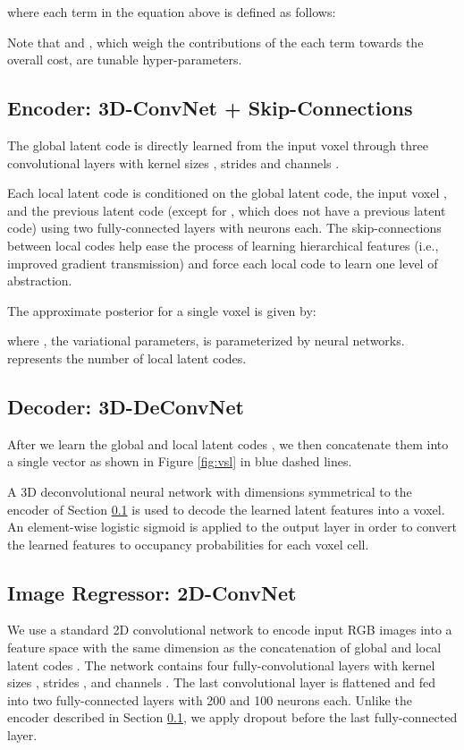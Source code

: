 \documentclass[10pt,twocolumn,letterpaper]{article}
\begin{document}
where each term in the equation above is defined as follows:

Note that  and , which weigh the contributions of the each term towards the overall cost, are tunable hyper-parameters.

\subsection{Encoder: 3D-ConvNet + Skip-Connections}
\label{subsec:encoder}
The global latent code  is directly learned from the input voxel through three convolutional layers with kernel sizes , strides  and channels .

Each local latent code  is conditioned on the global latent code, the input voxel , and the previous latent code (except for , which does not have a previous latent code) using two fully-connected layers with  neurons each. The skip-connections between local codes help ease the process of learning hierarchical features (i.e., improved gradient transmission) and force each local code to learn one level of abstraction.

The approximate posterior for a single voxel is given by:

where , the variational parameters, is parameterized by neural networks.  represents the number of local latent codes.

\subsection{Decoder: 3D-DeConvNet}
\label{subsec:decoder}
After we learn the global and local latent codes , we then concatenate them into a single vector as shown in Figure \ref{fig:vsl} in blue dashed lines.

A 3D deconvolutional neural network with dimensions symmetrical to the encoder of Section \ref{subsec:encoder} is used to decode the learned latent features into a voxel. An element-wise logistic sigmoid is applied to the output layer in order to convert the learned features to occupancy probabilities for each voxel cell.

\subsection{Image Regressor: 2D-ConvNet}
We use a standard 2D convolutional network to encode input RGB images into a feature space with the same dimension as the concatenation of global and local latent codes . The network contains four fully-convolutional layers with kernel sizes , strides , and channels . The last convolutional layer is flattened and fed into two fully-connected layers with 200 and 100 neurons each. Unlike the encoder described in Section \ref{subsec:encoder}, we apply dropout \cite{srivastava2014dropout} before the last fully-connected layer.
\end{document}
